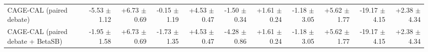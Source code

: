 \begin{tabular}{lrrrrrrrrrr}
CAGE-CAL (paired debate) & -5.53 {\scriptsize $\pm$ 1.12} & +6.73 {\scriptsize $\pm$ 0.69} & -0.15 {\scriptsize $\pm$ 1.19} & +4.53 {\scriptsize $\pm$ 0.47} & -1.50 {\scriptsize $\pm$ 0.34} & +1.61 {\scriptsize $\pm$ 0.24} & -1.18 {\scriptsize $\pm$ 3.05} & +5.62 {\scriptsize $\pm$ 1.77} & -19.17 {\scriptsize $\pm$ 4.15} & +2.38 {\scriptsize $\pm$ 4.34} \\
CAGE-CAL (paired debate + BetaSB) & -1.95 {\scriptsize $\pm$ 1.58} & +6.73 {\scriptsize $\pm$ 0.69} & -1.73 {\scriptsize $\pm$ 1.35} & +4.53 {\scriptsize $\pm$ 0.47} & -4.28 {\scriptsize $\pm$ 0.86} & +1.61 {\scriptsize $\pm$ 0.24} & -1.18 {\scriptsize $\pm$ 3.05} & +5.62 {\scriptsize $\pm$ 1.77} & -19.17 {\scriptsize $\pm$ 4.15} & +2.38 {\scriptsize $\pm$ 4.34} \\
\bottomrule
\end{tabular}
